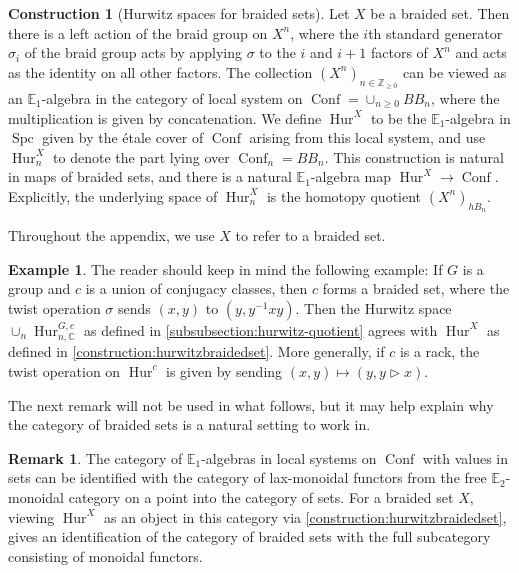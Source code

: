 \documentclass[12 pt]{amsart}
\theoremstyle{plain}
\theoremstyle{definition}
\newtheorem{construction}[theorem]{Construction}
\newtheorem{remark}[theorem]{Remark}
\newtheorem{example}[theorem]{Example}
\theoremstyle{remark}
\numberwithin{equation}{section}
\DeclareMathOperator\Spc{Spc}
\DeclareMathOperator\Hur{Hur}
\DeclareMathOperator\Conf{Conf}
\newcommand\NN{\mathbb{N}}
\newcommand\EE{\mathbb{E}}
\begin{document}
\begin{construction}[Hurwitz spaces for braided sets]\label{construction:hurwitzbraidedset}
	Let $X$ be a braided set. Then there is a left action of the braid group on
	$X^n$, where the $i$th standard generator $\sigma_i$ of the braid group acts by
	applying $\sigma$ to the $i$ and $i+1$ factors of $X^n$ and acts as the
	identity on all other factors. The collection $(X^n)_{n \in \mathbb
	Z_{\geq 0}}$ can be viewed as an $\EE_1$-algebra in the category of local system on $\Conf= \cup_{n\geq0}BB_n$, where the multiplication is given by concatenation. We define $\Hur^X$ to be the $\EE_1$-algebra in $\Spc$ given by the \'etale cover of $\Conf$ arising from this local system, and use $\Hur^X_n$ to denote the part lying over $\Conf_n = BB_n$. This construction is natural in maps of braided sets, and there is a natural $\EE_1$-algebra map $\Hur^{X} \to \Conf$. Explicitly, the underlying space of $\Hur^X_n$ is the homotopy quotient $(X^n)_{hB_n}$.
\end{construction}
Throughout the appendix, we use $X$ to refer to a braided set.

\begin{example}
	The reader should keep in mind the following example: If $G$ is a group and $c$ is a union of conjugacy classes, then $c$ forms a braided set, where the twist operation $\sigma$ sends $(x,y)$ to $(y,y^{-1}xy)$.
	Then the Hurwitz space $\cup_n \Hur^{G,c}_{n,\mathbb C}$ as defined in
	\autoref{subsubsection:hurwitz-quotient} agrees with $\Hur^{X}$ as defined in \autoref{construction:hurwitzbraidedset}.
	More generally, if $c$ is a rack, the twist operation on $\Hur^c$ is
	given by sending $(x,y) \mapsto (y, y \triangleright x)$.
\end{example}

The next remark will not be used in what follows, but it may help explain
why the category of braided sets is a natural setting to work in.
\begin{remark}
The category of $\EE_1$-algebras in local systems on $\Conf$ with values in sets
can be identified with the category of lax-monoidal functors from the free
$\EE_2$-monoidal category on a point into the category of sets. For a braided
set $X$, viewing $\Hur^X$ as an object in this category via \autoref{construction:hurwitzbraidedset}, gives an identification of the category of braided sets with the full subcategory consisting of monoidal functors.
\end{remark}
\end{document}
